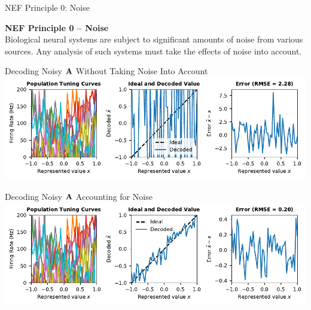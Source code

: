 \documentclass[handout,aspectratio=169]{beamer}
\begin{document}
\begin{frame}{NEF Principle 0: Noise}
\begin{mdframed}
	\textbf{NEF Principle 0 -- Noise}\\
	Biological neural systems are subject to significant amounts of noise from various sources. Any analysis of such systems must take the effects of noise into account.
\end{mdframed}
\end{frame}

\begin{frame}{Decoding Noisy ${\mathbf{A}}$ Without Taking Noise Into Account}
	\includegraphics[width=\textwidth]{media/decoding_example_noise.pdf}
\end{frame}

\begin{frame}{Decoding Noisy ${\mathbf{A}}$ Accounting for Noise}
	\includegraphics[width=\textwidth]{media/decoding_example_noise_accounted.pdf}
\end{frame}
\end{document}
